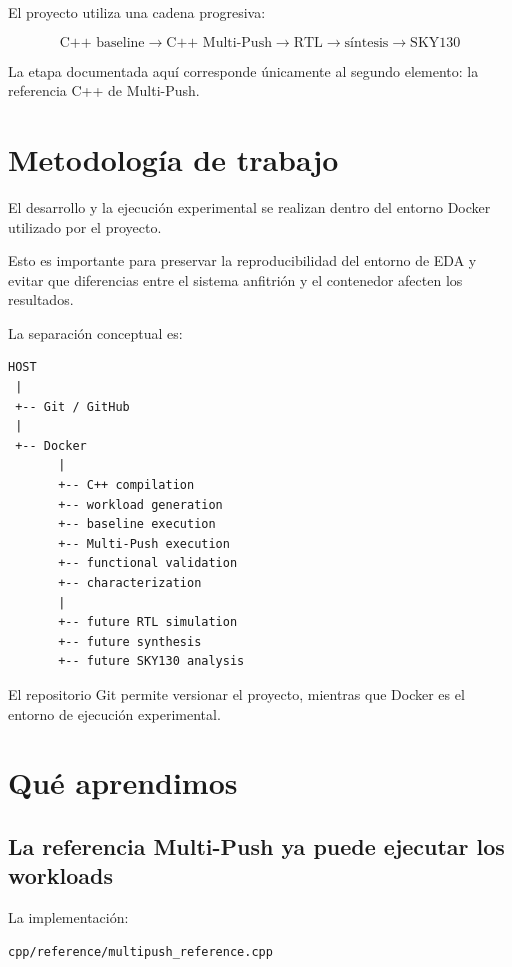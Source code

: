 \documentclass[11pt,a4paper]{article}
\begin{document}
El proyecto utiliza una cadena progresiva:

\[
\boxed{
\text{C++ baseline}
\rightarrow
\text{C++ Multi-Push}
\rightarrow
\text{RTL}
\rightarrow
\text{síntesis}
\rightarrow
\text{SKY130}
}
\]

La etapa documentada aquí corresponde únicamente al segundo elemento:
la referencia C++ de Multi-Push.

\section{Metodología de trabajo}

El desarrollo y la ejecución experimental se realizan dentro del
entorno Docker utilizado por el proyecto.

Esto es importante para preservar la reproducibilidad del entorno de
EDA y evitar que diferencias entre el sistema anfitrión y el contenedor
afecten los resultados.

La separación conceptual es:

\begin{lstlisting}[style=textfile]
HOST
 |
 +-- Git / GitHub
 |
 +-- Docker
       |
       +-- C++ compilation
       +-- workload generation
       +-- baseline execution
       +-- Multi-Push execution
       +-- functional validation
       +-- characterization
       |
       +-- future RTL simulation
       +-- future synthesis
       +-- future SKY130 analysis
\end{lstlisting}

El repositorio Git permite versionar el proyecto, mientras que Docker
es el entorno de ejecución experimental.

\section{Qué aprendimos}

\subsection{La referencia Multi-Push ya puede ejecutar los workloads}

La implementación:

\begin{lstlisting}[style=cpp]
cpp/reference/multipush_reference.cpp
\end{lstlisting}
\end{document}

